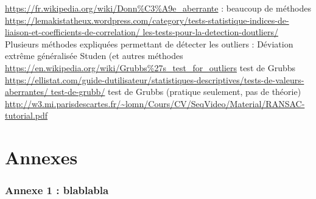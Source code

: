 \documentclass[a4paper,12pt]{article} %
\begin{document}
\url{https://fr.wikipedia.org/wiki/Donn\%C3\%A9e_aberrante} : beaucoup de méthodes \\
\url{https://lemakistatheux.wordpress.com/category/tests-statistique-indices-de-liaison-et-coefficients-de-correlation/ les-tests-pour-la-detection-doutliers/} Plusieurs méthodes expliquées permettant de détecter les outliers : Déviation extrême généralisée Studen (et autres méthodes \\
\url{ https://en.wikipedia.org/wiki/Grubbs\%27s_test_for_outliers} test de Grubbs \\
\url{https://ellistat.com/guide-dutilisateur/statistiques-descriptives/tests-de-valeurs-aberrantes/ test-de-grubb/} test de Grubbs (pratique seulement, pas de théorie)\\
\url{http://w3.mi.parisdescartes.fr/~lomn/Cours/CV/SeqVideo/Material/RANSAC-tutorial.pdf}\\

\renewcommand\partname{}
\part{Annexes}
	\section*{Annexe 1 : blablabla}

\begin{figure}
\begin{center}
\end{center}
\end{figure}
\end{document}
